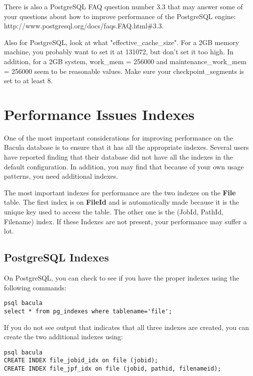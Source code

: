 There is also a PostgreSQL FAQ question number 3.3 that may
answer some of your questions about how to improve performance
of the PostgreSQL engine:
{http://www.postgresql.org/docs/faqs.FAQ.html\#3.3}.

Also for PostgreSQL, look at what "effective\_cache\_size". For a 2GB memory 
machine, you probably want to set it at 131072, but don't set it too high.
In addition, for a 2GB system, work\_mem = 256000 and
maintenance\_work\_mem = 256000 seem to be reasonable values.  Make
sure your checkpoint\_segments is set to at least 8.



\section{Performance Issues Indexes}
One of the most important considerations for improving performance on
the Bacula database is to ensure that it has all the appropriate indexes.
Several users have reported finding that their database did not have
all the indexes in the default configuration.  In addition, you may
find that because of your own usage patterns, you need additional indexes.

The most important indexes for performance are the two indexes on the
{\bf File} table.  The first index is on {\bf FileId} and is automatically
made because it is the unique key used to access the table.  The other
one is the (JobId, PathId, Filename) index.  If these Indexes
are not present, your performance may suffer a lot.

\subsection{PostgreSQL Indexes}
On PostgreSQL, you can check to see if you have the proper indexes using
the following commands:

\footnotesize
\begin{verbatim}
psql bacula
select * from pg_indexes where tablename='file';
\end{verbatim}
\normalsize

If you do not see output that indicates that all three indexes
are created, you can create the two additional indexes using:

\footnotesize
\begin{verbatim}
psql bacula
CREATE INDEX file_jobid_idx on file (jobid);
CREATE INDEX file_jpf_idx on file (jobid, pathid, filenameid);
\end{verbatim}
\normalsize

